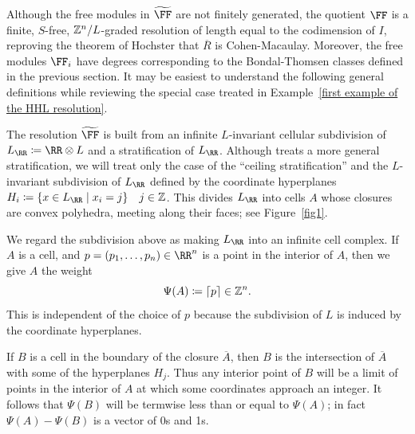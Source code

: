 \documentclass{amsart}
\begin{document}
Although the free modules in $\tF$ are not finitely generated, the quotient $\FF$
is a finite, $S$-free, $\mathbb Z^{n}/L$-graded resolution of length equal to the 
codimension of $I$, reproving the theorem of Hochster that
$\overline R$ is Cohen-Macaulay. Moreover, the free modules $\FF_{i}$ have degrees
corresponding to the Bondal-Thomsen classes defined in the previous section. It may be easiest to
understand the following general definitions while reviewing the special case treated in Example~\ref{first example of the HHL resolution}.


The resolution $\tF$ is built from an infinite $L$-invariant cellular subdivision of $L_\RR \ce \RR\otimes L$
and a stratification of $L_{\RR}$.  Although \cite{BCS+25} treats a more general stratification, we will
treat only the case of  the ``ceiling stratification'' and the $L$-invariant subdivision of $L_\RR$ defined by the coordinate hyperplanes $H_i \ce \{x\in L_\RR\mid x_i = j\}\quad j\in \ZZ$. This divides $L_\RR$ into cells $A$ whose closures are convex polyhedra, meeting along their faces; see Figure~\ref{fig1}.


We regard the subdivision above as making $L_{\RR}$ into an infinite cell complex.
If $A$ is a cell, and $p = (p_1,\dots, p_n) \in \RR^n$ is a point in the
interior of $A$, then we give $A$ the weight 
$$
\Psi(A) \coloneqq \lceil p \rceil \in \mathbb Z^{n}.
$$
This is independent of the choice of $p$ because the subdivision of $L$ is induced by the coordinate hyperplanes.
 
If $B$ is 
a cell in the boundary of the closure $\overline A$, then $B$ is the intersection of
$\overline A$ with some of the hyperplanes $H_{j}$. Thus any interior point of $B$ will
be a limit of points in the interior of $A$ at which some coordinates approach an integer. It follows that
$\Psi(B)$ will be termwise less than or equal to $\Psi(A)$; in fact $\Psi(A) - \Psi(B)$ is a vector
of 0s and 1s.
\end{document}
